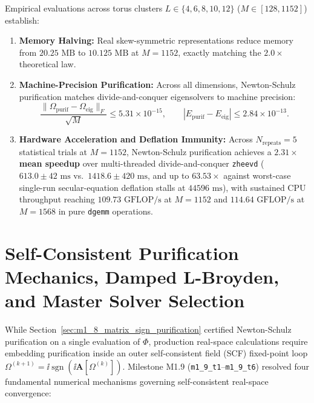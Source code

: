 \begin{proposition}
\label{prop:m1_8_benchmark_results}
Empirical evaluations across torus clusters $L \in \{4, 6, 8, 10, 12\}$ ($M \in [128, 1152]$) establish:
\begin{enumerate}
\item \textbf{Memory Halving:} Real skew-symmetric representations reduce memory from $20.25\text{ MB}$ to $10.125\text{ MB}$ at $M=1152$, exactly matching the $2.0\times$ theoretical law.
\item \textbf{Machine-Precision Purification:} Across all dimensions, Newton-Schulz purification matches divide-and-conquer eigensolvers to machine precision:
\begin{equation}
\frac{\|\Omega_{\mathrm{purif}} - \Omega_{\mathrm{eig}}\|_F}{\sqrt{M}} \le 5.31 \times 10^{-15}, \qquad |E_{\mathrm{purif}} - E_{\mathrm{eig}}| \le 2.84 \times 10^{-13}.
\end{equation}
\item \textbf{Hardware Acceleration and Deflation Immunity:} Across $N_{\mathrm{repeats}} = 5$ statistical trials at $M = 1152$, Newton-Schulz purification achieves a \textbf{$2.31\times$ mean speedup} over multi-threaded divide-and-conquer \texttt{zheevd} ($613.0 \pm 42\text{ ms}$ vs.\ $1418.6 \pm 420\text{ ms}$, and up to $63.53\times$ against worst-case single-run secular-equation deflation stalls at $44596\text{ ms}$), with sustained CPU throughput reaching $109.73\text{ GFLOP/s}$ at $M=1152$ and $114.64\text{ GFLOP/s}$ at $M=1568$ in pure \texttt{dgemm} operations.
\end{enumerate}
\end{proposition}

\section{Self-Consistent Purification Mechanics, Damped L-Broyden, and Master Solver Selection}
\label{sec:m1_9_scf_purification_and_master_table}

While Section~\ref{sec:m1_8_matrix_sign_purification} certified Newton-Schulz purification on a single evaluation of $\Phi$, production real-space calculations require embedding purification inside an outer self-consistent field (SCF) fixed-point loop $\Omega^{(k+1)} = \ii\operatorname{sgn}(\ii\mathbf{A}[\Omega^{(k)}])$. Milestone M1.9 (\texttt{m1\_9\_t1}--\texttt{m1\_9\_t6}) resolved four fundamental numerical mechanisms governing self-consistent real-space convergence:

